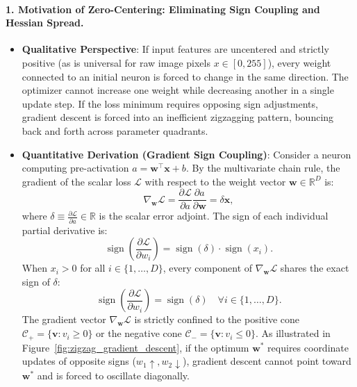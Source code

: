 \paragraph{1. Motivation of Zero-Centering: Eliminating Sign Coupling and Hessian Spread.}
\begin{itemize}[leftmargin=*]
  \item \textbf{Qualitative Perspective}: If input features are uncentered and strictly positive (as is universal for raw image pixels $x \in [0, 255]$), every weight connected to an initial neuron is forced to change in the same direction. The optimizer cannot increase one weight while decreasing another in a single update step. If the loss minimum requires opposing sign adjustments, gradient descent is forced into an inefficient zigzagging pattern, bouncing back and forth across parameter quadrants.
  \item \textbf{Quantitative Derivation (Gradient Sign Coupling)}: Consider a neuron computing pre-activation $a = \mathbf{w}^\top \mathbf{x} + b$. By the multivariate chain rule, the gradient of the scalar loss $\mathcal{L}$ with respect to the weight vector $\mathbf{w} \in \mathbb{R}^D$ is:
    \begin{equation}
    \nabla_{\mathbf{w}} \mathcal{L} = \frac{\partial \mathcal{L}}{\partial a} \frac{\partial a}{\partial \mathbf{w}} = \delta \mathbf{x},
    \label{eq:grad_weight_vector_chain}
    \end{equation}
    where $\delta \equiv \frac{\partial \mathcal{L}}{\partial a} \in \mathbb{R}$ is the scalar error adjoint. The sign of each individual partial derivative is:
    \begin{equation}
    \operatorname{sign}\left( \frac{\partial \mathcal{L}}{\partial w_i} \right) = \operatorname{sign}(\delta) \cdot \operatorname{sign}(x_i).
    \end{equation}
    When $x_i > 0$ for all $i \in \{1, \dots, D\}$, every component of $\nabla_{\mathbf{w}} \mathcal{L}$ shares the exact sign of $\delta$:
    \begin{equation}
    \operatorname{sign}\left( \frac{\partial \mathcal{L}}{\partial w_i} \right) = \operatorname{sign}(\delta) \quad \forall i \in \{1, \dots, D\}.
    \label{eq:all_positive_grad_sign}
    \end{equation}
    The gradient vector $\nabla_{\mathbf{w}} \mathcal{L}$ is strictly confined to the positive cone $\mathcal{C}_+ = \{\mathbf{v} : v_i \ge 0\}$ or the negative cone $\mathcal{C}_- = \{\mathbf{v} : v_i \le 0\}$. As illustrated in Figure~\ref{fig:zigzag_gradient_descent}, if the optimum $\mathbf{w}^*$ requires coordinate updates of opposite signs ($w_1 \uparrow, w_2 \downarrow$), gradient descent cannot point toward $\mathbf{w}^*$ and is forced to oscillate diagonally.

\end{itemize}
